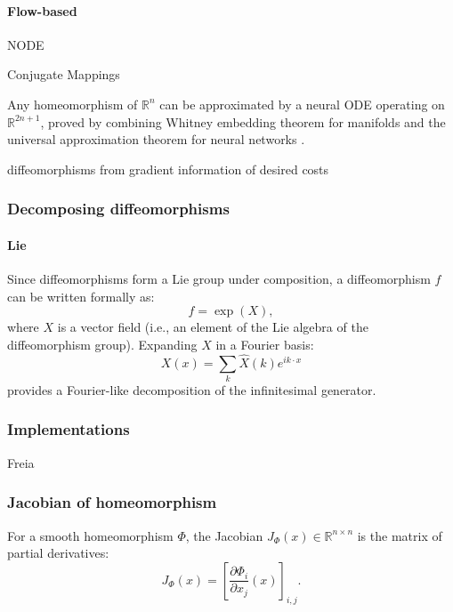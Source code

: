 \documentclass{article}
\theoremstyle{definition} \newtheorem{definition}{Definition}  \newtheorem{example}{Example}
\theoremstyle{remark} \newtheorem{remark}{Remark}
\newcounter{ct}
\begin{document}
\paragraph{Flow-based}
NODE\citep{finlay2020trainnode}
\citep{torchdiffeq}

Conjugate Mappings \citep{bramburger2021conjugate}

Any homeomorphism of $\mathbb {R} ^{n}$ can be approximated by a neural ODE operating on $\mathbb {R} ^{2n+1}$, proved by combining Whitney embedding theorem for manifolds and the universal approximation theorem for neural networks  \citep{zhang2020approximation}.

diffeomorphisms from gradient information of desired costs \citep{lai2021parallelised}



\subsubsection{Decomposing diffeomorphisms}\label{sec:diff_dec}
\paragraph{Lie}
Since diffeomorphisms form a Lie group under composition, a diffeomorphism 
\( f \) can be written formally as:
\[
f = \exp(X),
\]
where \( X \) is a vector field (i.e., an element of the Lie algebra of the diffeomorphism group). Expanding \( X \) in a Fourier basis:
\[
X(x) = \sum_k \hat{X}(k) e^{i k \cdot x}
\]
provides a Fourier-like decomposition of the infinitesimal generator.

\subsubsection{Implementations}
Freia\citep{freia} %

\citep{dinh2016density} %

\citep{stimper2023normflows} %



\subsubsection{Jacobian of homeomorphism}
 For a smooth homeomorphism \( \Phi \), the Jacobian \( J_{\Phi}(x) \in \mathbb{R}^{n \times n} \) is the matrix of partial derivatives:
\[
J_{\Phi}(x) = \left[ \frac{\partial \Phi_i}{\partial x_j}(x) \right]_{i,j}.
\]
\end{document}
